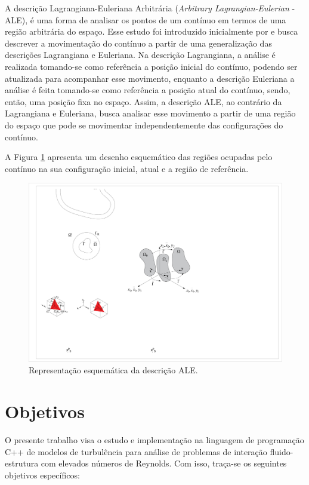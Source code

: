\documentclass[_ArquivoPrincipal.tex]{subfiles}
\begin{document}
A descrição Lagrangiana-Euleriana Arbitrária (\textit{Arbitrary Lagrangian-Eulerian} - ALE), é uma forma de analisar os pontos de um contínuo em termos de uma região arbitrária do espaço. Esse estudo foi introduzido inicialmente por  e busca descrever a movimentação do contínuo a partir de uma generalização das descrições Lagrangiana e Euleriana. Na descrição Lagrangiana, a análise é realizada tomando-se como referência a posição inicial do contínuo, podendo ser atualizada para acompanhar esse movimento, enquanto a descrição Euleriana a análise é feita tomando-se como referência a posição atual do contínuo, sendo, então, uma posição fixa no espaço. Assim, a descrição ALE, ao contrário da Lagrangiana e Euleriana, busca analisar esse movimento a partir de uma região do espaço que pode se movimentar independentemente das configurações do contínuo.

A Figura \ref{fig:ALE} apresenta um desenho esquemático das regiões ocupadas pelo contínuo na sua configuração inicial, atual e a região de referência.

\begin{figure}[h]
    \centering
    \includegraphics[width=0.5\linewidth]{Figuras/ALE1.pdf}
    \caption{Representação esquemática da descrição ALE.}
    \label{fig:ALE}
\end{figure}

\section{Objetivos}

O presente trabalho visa o estudo e implementação na linguagem de programação C++ de modelos de turbulência para análise de problemas de interação fluido-estrutura com elevados números de Reynolds. Com isso, traça-se os seguintes objetivos específicos:
\end{document}

